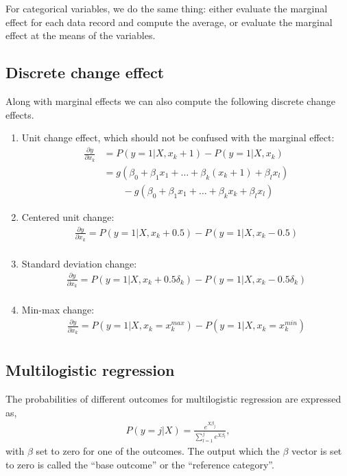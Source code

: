 For categorical variables, we do the same thing: either evaluate the
marginal effect for each data record and compute the average, or
evaluate the marginal effect at the means of the variables.

\subsection{Discrete change effect} %
\label{sub:discrete_change_effect}
Along with marginal effects we can also compute the following discrete change
effects.

\begin{enumerate}
  \item Unit change effect, which should not be confused with the
marginal effect:
\begin{align*}
   \frac{\partial y}{\partial x_k} & = P(y=1|X,x_k+1) - P(y=1|X, x_k) \\
                                     & = g(\beta_0 + \beta_1 x_1 + \dots  + \beta_k (x_k+1) + \beta_l x_l) \\
                                    & \qquad  - g(\beta_0 + \beta_1 x_1 + \dots  + \beta_k x_k + \beta_l x_l)
 \end{align*}
    \item Centered unit change:
        \begin{gather*}
          \frac{\partial y}{\partial x_k} = P(y=1|X,x_k+0.5) - P(y=1|X, x_k-0.5) \\
        \end{gather*}
    \item Standard deviation change:
        \begin{gather*}
          \frac{\partial y}{\partial x_k} = P(y=1|X,x_k+0.5\delta_k) - P(y=1|X, x_k-0.5\delta_k) \\
        \end{gather*}
    \item Min-max change:
        \begin{gather*}
          \frac{\partial y}{\partial x_k} = P(y=1|X,x_k=x_k^{max}) - P(y=1|X, x_k=x_k^{min}) \\
        \end{gather*}
\end{enumerate}

\subsection{Multilogistic regression} %
\label{sub:multilogistic_regression}
The probabilities of different outcomes for multilogistic regression are expressed as,
\begin{gather*}
  P(y=j | X)  = \frac{e^{X\beta_j}}{\sum_{l=1}^{j} e^{X\beta_l}},
\end{gather*}
with $\beta$ set to zero for one of the outcomes. The output which the
$\beta$ vector is set to zero is called the ``base outcome'' or the ``reference category''.

